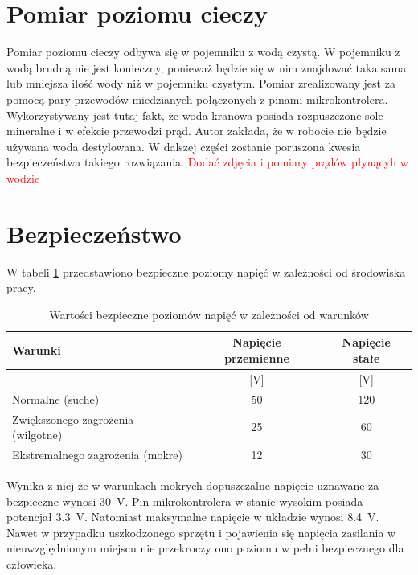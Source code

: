 	\section{Pomiar poziomu cieczy}
	    Pomiar poziomu cieczy odbywa się w pojemniku z wodą czystą. W pojemniku z wodą brudną nie jest konieczny, ponieważ będzie się w nim znajdować taka sama lub mniejsza ilość wody niż w pojemniku czystym. Pomiar zrealizowany jest za pomocą pary przewodów miedzianych połączonych z pinami mikrokontrolera. Wykorzystywany jest tutaj fakt, że woda kranowa posiada rozpuszczone sole mineralne i w efekcie przewodzi prąd. Autor zakłada, że w robocie nie będzie używana woda destylowana. W dalszej części zostanie poruszona kwesia bezpieczeństwa takiego rozwiązania. \textcolor{red}{Dodać zdjęcia i pomiary prądów płynącyh w wodzie}
	    
    \section{Bezpieczeństwo}
	    W tabeli \ref{tab:napieciaBezpieczne} przedstawiono bezpieczne poziomy napięć w zależności od środowiska pracy.
	    \begin{table}[ht]
			\centering
			\begin{tabular}{|l|c|c|} \hline
				\textbf{Warunki} & \textbf{Napięcie przemienne} & \textbf{Napięcie stałe} \\
				\hline
				 & [V] & [V] \\
				\hline
				\hline Normalne (suche) & 50 & 120 \\
				\hline Zwiększonego zagrożenia (wilgotne) & 25 & 60 \\
				\hline Ekstremalnego zagrożenia (mokre) & 12 & 30 \\
				\hline
			\end{tabular}
			\caption{Wartości bezpieczne poziomów napięć w zależności od warunków}
			\label{tab:napieciaBezpieczne}
		\end{table}
		Wynika z niej że w warunkach mokrych dopuszczalne napięcie uznawane za bezpieczne wynosi \SI{30}{\volt}. Pin mikrokontrolera w stanie wysokim posiada potencjał \SI{3.3}{\volt}. Natomiast maksymalne napięcie w układzie wynosi \SI{8.4}{\volt}. Nawet w przypadku uszkodzonego sprzętu i pojawienia się napięcia zasilania w nieuwzględnionym miejscu nie przekroczy ono poziomu w pełni bezpiecznego dla człowieka.
